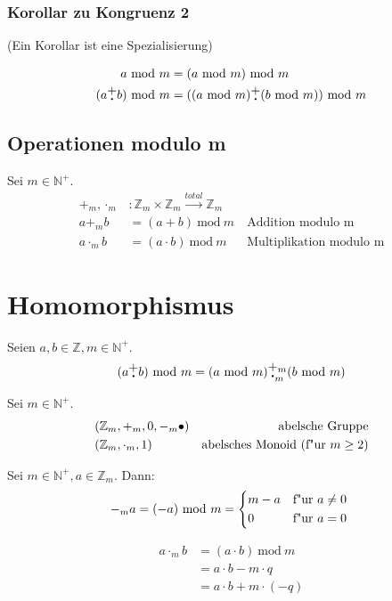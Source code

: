 \documentclass[a4paper, ngerman, landscape, fleqn]{article}
\newcommand{\Mod}{\ \mathrm{mod}\ }
\newcommand{\plusdot}{\stackanchor[1pt]{$+$}{$\boldsymbol{\cdot}$}}
\newcommand{\plusdotm}{\stackanchor[1pt]{$+_m$}{$\boldsymbol{\cdot}_m$}}
\begin{document}
\begin{multicols*}{3}
\subsubsection*{Korollar zu Kongruenz 2}
(Ein Korollar ist eine Spezialisierung)

\begin{align*}
    a \Mod m &= (a \Mod m) \Mod m \\
    (a \plusdot b) \Mod m &= ((a \Mod m) \plusdot (b \Mod m)) \Mod m
\end{align*}

\subsection*{Operationen modulo m}
Sei $m \in \mathbb{N}^+$.
\begin{alignat*}{2}
    +_m, \cdot_m &: \mathbb{Z}_m \times \mathbb{Z}_m \xrightarrow{total} \mathbb{Z}_m & \\
    a +_m b &= (a + b) \Mod m \ &\text{Addition modulo m} \\
    a \cdot_m b &= (a \cdot b) \Mod m \ &\text{Multiplikation modulo m} 
\end{alignat*}


\section*{Homomorphismus}
Seien $a, b \in \mathbb{Z}, m \in \mathbb{N}^+$.
\begin{equation*}
    (a \plusdot b) \Mod m = (a \Mod m) \plusdotm (b \Mod m)
\end{equation*}

Sei $m \in \mathbb{N}^+$.
\begin{alignat*}{2}
    &(\mathbb{Z}_m, +_m, 0, -_m\bullet) & \hfill \text{abelsche Gruppe} \\
    &(\mathbb{Z}_m, \cdot_m, 1) & \hfill \text{abelsches Monoid (f"ur $m \geq 2$)} \\
\end{alignat*}

Sei $m \in \mathbb{N}^+, a \in \mathbb{Z}_m$. Dann:
\begin{equation*}
    -_m a = (-a) \Mod m = 
    \begin{cases*}
        m - a & f"ur $a \neq 0$ \\
        0     & f"ur $a = 0$
    \end{cases*}
\end{equation*}

\begin{align*}
    a \cdot_m b &= (a \cdot b) \Mod m \\
                &= a \cdot b - m \cdot q \\
                &= a \cdot b + m \cdot (-q)
\end{align*}



\end{multicols*}
\end{document}
